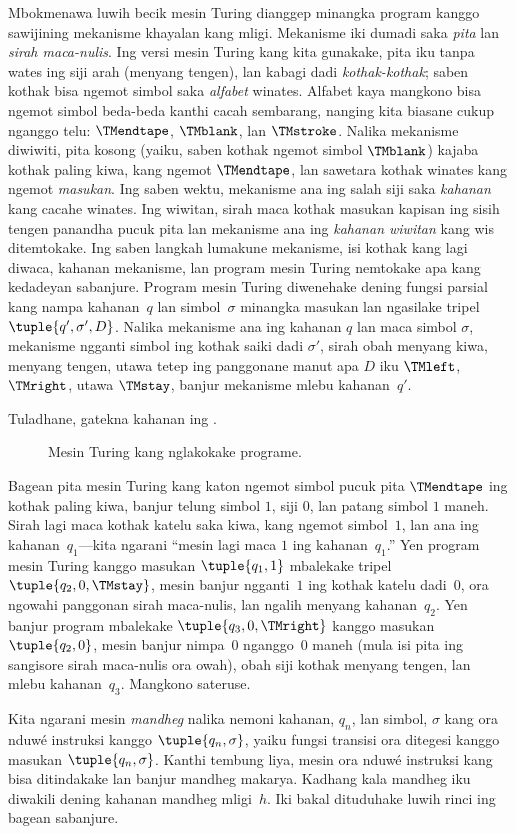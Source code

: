 \documentclass[../../../include/open-logic-section]{subfiles}
\begin{document}
\begin{explain}
Mbokmenawa luwih becik mesin Turing dianggep
minangka program kanggo sawijining mekanisme
khayalan kang mligi. Mekanisme iki dumadi saka
\emph{pita} lan \emph{sirah maca-nulis}. Ing versi
mesin Turing kang kita gunakake, pita iku tanpa
wates ing siji arah (menyang tengen), lan kabagi
dadi \emph{kothak-kothak}; saben kothak bisa ngemot
simbol saka \emph{alfabet} winates. Alfabet kaya
mangkono bisa ngemot simbol beda-beda kanthi cacah
sembarang, nanging kita biasane cukup nganggo telu:
$\TMendtape$, $\TMblank$, lan $\TMstroke$. Nalika
mekanisme diwiwiti, pita kosong (yaiku, saben
kothak ngemot simbol $\TMblank$) kajaba kothak
paling kiwa, kang ngemot $\TMendtape$, lan
sawetara kothak winates kang ngemot \emph{masukan}.
Ing saben wektu, mekanisme ana ing salah siji
saka \emph{kahanan} kang cacahe winates. Ing wiwitan,
sirah maca kothak masukan kapisan ing sisih tengen panandha pucuk pita lan mekanisme ana
ing \emph{kahanan wiwitan} kang wis ditemtokake.
Ing saben langkah lumakune mekanisme, isi kothak
kang lagi diwaca, kahanan mekanisme, lan program
mesin Turing nemtokake apa kang kedadeyan sabanjure.
Program mesin Turing diwenehake dening fungsi
parsial kang nampa kahanan~$q$ lan simbol~$\sigma$
minangka masukan lan ngasilake tripel~$\tuple{q', \sigma',
  D}$. Nalika mekanisme ana ing kahanan $q$ lan
maca simbol $\sigma$, mekanisme ngganti simbol
ing kothak saiki dadi $\sigma'$, sirah obah
menyang kiwa, menyang tengen, utawa tetep ing
panggonane manut apa $D$ iku $\TMleft$,
$\TMright$, utawa $\TMstay$, banjur mekanisme
mlebu kahanan~$q'$.

Tuladhane, gatekna kahanan ing .
\begin{figure}
  \caption{Mesin Turing kang nglakokake programe.}
\end{figure}
Bagean pita mesin Turing kang katon ngemot
simbol pucuk pita $\TMendtape$ ing kothak paling
kiwa, banjur telung simbol $1$, siji $0$,
lan patang simbol $1$ maneh. Sirah lagi maca
kothak katelu saka kiwa, kang ngemot
simbol~$1$, lan ana ing kahanan~$q_1$---kita
ngarani ``mesin lagi maca $1$ ing
kahanan~$q_1$.'' Yen program mesin Turing
kanggo masukan $\tuple{q_1, 1}$ mbalekake
tripel $\tuple{q_2,
0, \TMstay}$, mesin banjur ngganti~$1$ ing
kothak katelu dadi~$0$, ora ngowahi panggonan
sirah maca-nulis, lan ngalih menyang kahanan~$q_2$.
Yen banjur program mbalekake $\tuple{q_3, 0, \TMright}$
kanggo masukan $\tuple{q_2, 0}$, mesin banjur
nimpa~$0$ nganggo~$0$ maneh (mula isi pita ing
sangisore sirah maca-nulis ora owah), obah
siji kothak menyang tengen, lan mlebu
kahanan~$q_3$. Mangkono sateruse.

Kita ngarani mesin \emph{mandheg} nalika
nemoni kahanan, $q_n$, lan simbol, $\sigma$
kang ora nduwé instruksi kanggo
$\tuple{q_n, \sigma}$, yaiku fungsi transisi
ora ditegesi kanggo masukan $\tuple{q_n,\sigma}$.
Kanthi tembung liya, mesin ora nduwé instruksi
kang bisa ditindakake lan banjur mandheg
makarya. Kadhang kala mandheg iku diwakili
dening kahanan mandheg mligi~$h$. Iki bakal
dituduhake luwih rinci ing bagean sabanjure.
\end{explain}
\end{document}
